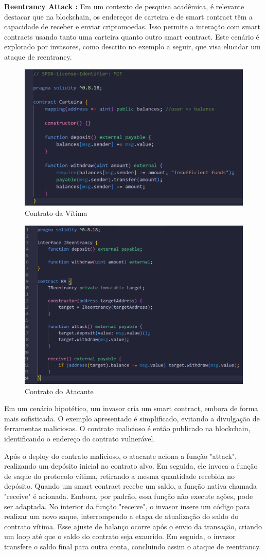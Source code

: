 \textbf{Reentrancy Attack \cite{RA}: } Em um contexto de pesquisa acadêmica, é relevante destacar que na blockchain, os endereços de carteira e de smart contract têm a capacidade de receber e enviar criptomoedas. Isso permite a interação com smart contracts usando tanto uma carteira quanto outro smart contract. Este cenário é explorado por invasores, como descrito no exemplo a seguir, que visa elucidar um ataque de reentrancy.
\begin{figure}
    \centering
    \includegraphics[width=0.5\linewidth]{figuras/VitimaRA.png}
    \caption{Contrato da Vítima}
    \label{fig:enter-label}
\end{figure}
\begin{figure}
    \centering
    \includegraphics[width=0.5\linewidth]{figuras/RA.png}
    \caption{Contrato do Atacante}
    \label{fig:enter-label}
\end{figure}

Em um cenário hipotético, um invasor cria um smart contract, embora de forma mais sofisticada. O exemplo apresentado é simplificado, evitando a divulgação de ferramentas maliciosas. O contrato malicioso é então publicado na blockchain, identificando o endereço do contrato vulnerável.


Após o deploy do contrato malicioso, o atacante aciona a função "attack", realizando um depósito inicial no contrato alvo. Em seguida, ele invoca a função de saque do protocolo vítima, retirando a mesma quantidade recebida no depósito. Quando um smart contract recebe um saldo, a função nativa chamada "receive" é acionada. Embora, por padrão, essa função não execute ações, pode ser adaptada. No interior da função "receive", o invasor insere um código para realizar um novo saque, interrompendo a etapa de atualização do saldo do contrato vítima. Esse ajuste de balanço ocorre após o envio da transação, criando um loop até que o saldo do contrato seja exaurido. Em seguida, o invasor transfere o saldo final para outra conta, concluindo assim o ataque de reentrancy.

